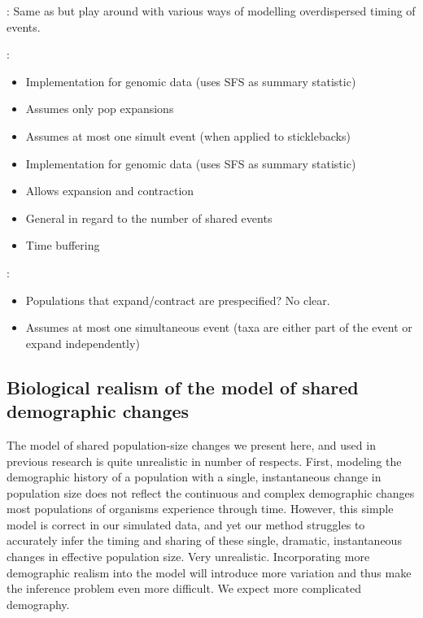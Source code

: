 \citet{Gehara2017}:
Same as \citet{Chan2014} but play around with various ways of modelling
overdispersed timing of events.

\citet{Xue2015}:
\begin{itemize}
    \item Implementation for genomic data (uses SFS as summary statistic)
    \item Assumes only pop expansions
    \item Assumes at most one simult event (when applied to sticklebacks)
\end{itemize}

\citet{Xue2017}
\begin{itemize}
    \item Implementation for genomic data (uses SFS as summary statistic)
    \item Allows expansion and contraction
    \item General in regard to the number of shared events
    \item Time buffering
\end{itemize}

\citet{Prates2016}:
\begin{itemize}
    \item Populations that expand/contract are prespecified? No clear.
    \item Assumes at most one simultaneous event (taxa are either part of the
        event or expand independently)
\end{itemize}

\subsection{Biological realism of the model of shared demographic changes}
The model of shared population-size changes we present here, and used in
previous research \citep{Chan2014,Xue2015,Gehara2017} is quite unrealistic in
number of respects.
First, modeling the demographic history of a population with a single,
instantaneous change in population size does not reflect the continuous and
complex demographic changes most populations of organisms experience through
time.
However, this simple model is correct in our simulated data, and yet our method
struggles to accurately infer the timing and sharing of these single, dramatic,
instantaneous changes in effective population size.
Very unrealistic.
Incorporating more demographic realism into the model will introduce more
variation and thus make the inference problem even more difficult.
We expect more complicated demography.

